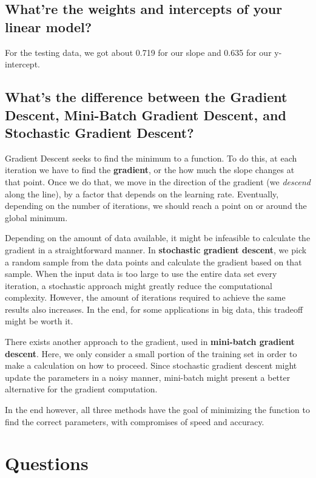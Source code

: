 \documentclass{article}
\begin{document}
		\subsection{What're the weights and intercepts of your linear model?}

				For the testing data, we got about 0.719 for our slope and 0.635 for our 
				y-intercept.

		\subsection{What's the difference between the Gradient Descent, Mini-Batch Gradient
				Descent, and Stochastic Gradient Descent?}
				
				Gradient Descent seeks to find the minimum to a function. To do this, at each 
				iteration we have to find the \textbf{gradient}, or the how much the slope changes
				at that point. Once we do that, we move in the direction of the gradient (we 
				\textit{descend} along the line), by a factor that depends on the learning rate.
				Eventually, depending on the number of iterations, we should reach a point 
				on or around the global minimum.

				Depending on the amount of data available, it might be infeasible to calculate
				the gradient in a straightforward manner. In \textbf{stochastic gradient descent},
				we pick a random sample from the data points and calculate the gradient based on that
				sample. When the input data is too large to use the entire data set every iteration,
				a stochastic approach might greatly reduce the computational complexity. However,
				the amount of iterations required to achieve the same results also increases. In the end,
				for some applications in big data, this tradeoff might be worth it.

				There exists another approach to the gradient, used in \textbf{mini-batch gradient descent}.
				Here, we only consider a small portion of the training set in  order to make a calculation
				on how to proceed. Since stochastic gradient descent might update the parameters in a noisy 
				manner, mini-batch might present a better alternative for the gradient computation.

				In the end however, all three methods have the goal of minimizing the function to find the 
				correct parameters, with compromises of speed and accuracy.


\section{Questions}
\end{document}
